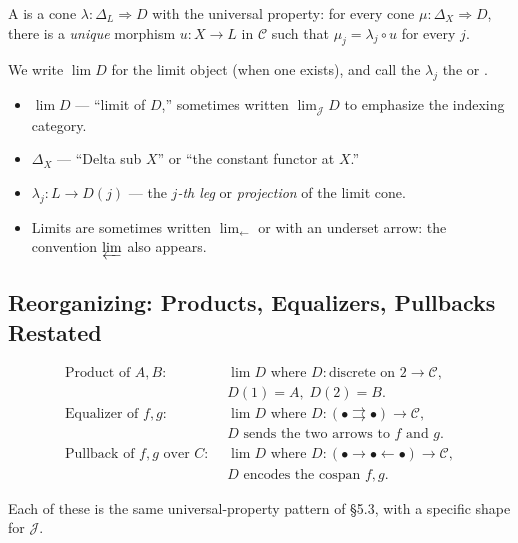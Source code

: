 A  is a cone $\lambda : \Delta_L \Rightarrow D$ with
the universal property: for every cone $\mu : \Delta_X \Rightarrow D$,
there is a \emph{unique} morphism $u : X \to L$ in $\mathcal{C}$ such
that $\mu_j = \lambda_j \circ u$ for every $j$.

We write $\lim D$ for the limit object (when one exists), and call the
$\lambda_j$ the  or .

\begin{howtosay}
\begin{itemize}
  \item $\lim D$ --- ``limit of $D$,'' sometimes written
        $\lim_{\mathcal{J}} D$ to emphasize the indexing category.
  \item $\Delta_X$ --- ``Delta sub $X$'' or ``the constant functor at $X$.''
  \item $\lambda_j : L \to D(j)$ --- the \emph{$j$-th leg} or
        \emph{projection} of the limit cone.
  \item Limits are sometimes written $\lim_\leftarrow$ or with an
        underset arrow: the convention $\varprojlim$ also appears.
\end{itemize}
\end{howtosay}

\subsection{Reorganizing: Products, Equalizers, Pullbacks Restated}

\begin{align*}
  \text{Product of $A, B$:} & \;\; \lim D \text{ where } D : \text{discrete on } 2 \to \mathcal{C}, \\
    & \;\; D(1) = A,\; D(2) = B. \\
  \text{Equalizer of $f, g$:} & \;\; \lim D \text{ where } D : (\bullet \rightrightarrows \bullet) \to \mathcal{C}, \\
    & \;\; D \text{ sends the two arrows to } f \text{ and } g. \\
  \text{Pullback of $f, g$ over $C$:} & \;\; \lim D \text{ where } D : (\bullet \to \bullet \leftarrow \bullet) \to \mathcal{C}, \\
    & \;\; D \text{ encodes the cospan } f, g.
\end{align*}

Each of these is the same universal-property pattern of \S5.3, with a
specific shape for $\mathcal{J}$.

